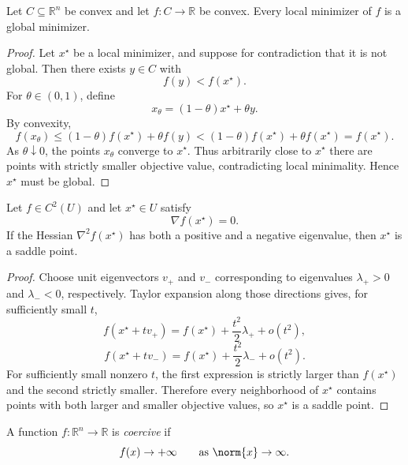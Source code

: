 \begin{theorem}\label{thm:l1-local-minima-of-convex-functions-are-global}
	Let $C \subseteq \mathbb{R}^n$ be convex and let $f:C \to \mathbb{R}$ be convex. Every local minimizer of $f$ is a global minimizer.
\end{theorem}
\begin{proof}
	Let $x^\star$ be a local minimizer, and suppose for contradiction that it is not global. Then there exists $y \in C$ with
	\[
		f(y)<f(x^\star).
	\]
	For $\theta \in (0,1)$, define
	\[
		x_\theta = (1-\theta)x^\star+\theta y.
	\]
	By convexity,
	\[
		f(x_\theta)
		\le (1-\theta)f(x^\star)+\theta f(y)
		< (1-\theta)f(x^\star)+\theta f(x^\star)
		= f(x^\star).
	\]
	As $\theta \downarrow 0$, the points $x_\theta$ converge to $x^\star$. Thus arbitrarily close to $x^\star$ there are points with strictly smaller objective value, contradicting local minimality. Hence $x^\star$ must be global.
\end{proof}

\begin{proposition}\label{prop:l1-indefinite-hessian-implies-saddle-point}
	Let $f \in C^2(U)$ and let $x^\star \in U$ satisfy
	\[
		\nabla f(x^\star)=0.
	\]
	If the Hessian $\nabla^2 f(x^\star)$ has both a positive and a negative eigenvalue, then $x^\star$ is a saddle point.
\end{proposition}
\begin{proof}
	Choose unit eigenvectors $v_+$ and $v_-$ corresponding to eigenvalues $\lambda_+>0$ and $\lambda_-<0$, respectively. Taylor expansion along those directions gives, for sufficiently small $t$,
	\[
		f(x^\star+tv_+) = f(x^\star) + \frac{t^2}{2}\lambda_+ + o(t^2),
	\]
	\[
		f(x^\star+tv_-) = f(x^\star) + \frac{t^2}{2}\lambda_- + o(t^2).
	\]
	For sufficiently small nonzero $t$, the first expression is strictly larger than $f(x^\star)$ and the second strictly smaller. Therefore every neighborhood of $x^\star$ contains points with both larger and smaller objective values, so $x^\star$ is a saddle point.
\end{proof}

\begin{definition}\label{def:l1-coercive-function}
	A function $f:\mathbb{R}^n \to \mathbb{R}$ is \emph{coercive} if
	\[
		f(x)\to +\infty
		\qquad \text{as } \norm{x}\to \infty.
	\]
\end{definition}


